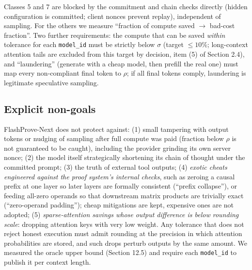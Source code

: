 \documentclass[10pt]{article}
\begin{document}
Classes 5 and 7 are blocked by the commitment and chain checks directly (hidden configuration is committed; client nonces prevent replay), independent of sampling. For the others we measure ``fraction of compute saved $\to$ bad-cost fraction''. Two further requirements: the compute that can be saved \emph{within} tolerance for each \texttt{model\_\allowbreak{}id} must be strictly below $\sigma$ (target $\le10\%$; long-context attention tails are excluded from this target by decision, item (5) of Section 2.4), and ``laundering'' (generate with a cheap model, then prefill the real one) must map every non-compliant final token to $\rho$; if all final tokens comply, laundering is legitimate speculative sampling.

\subsection{Explicit non-goals}
FlashProve-Next does not protect against: (1) small tampering with output tokens or nudging of sampling after full compute was paid (fraction below $\rho$ is not guaranteed to be caught), including the provider grinding its own server nonce; (2) the model itself strategically shortening its chain of thought under the committed prompt; (3) the truth of external tool outputs; (4) \emph{exotic cheats engineered against the proof system's internal checks}, such as zeroing a causal prefix at one layer so later layers are formally consistent (``prefix collapse''), or feeding all-zero operands so that downstream matrix products are trivially exact (``zero-operand padding''); cheap mitigations are kept, expensive ones are not adopted; (5) \emph{sparse-attention savings whose output difference is below rounding scale}: dropping attention keys with very low weight. Any tolerance that does not reject honest execution must admit rounding at the precision in which attention probabilities are stored, and such drops perturb outputs by the same amount. We measured the oracle upper bound (Section 12.5) and require each \texttt{model\_\allowbreak{}id} to publish it per context length.
\end{document}
